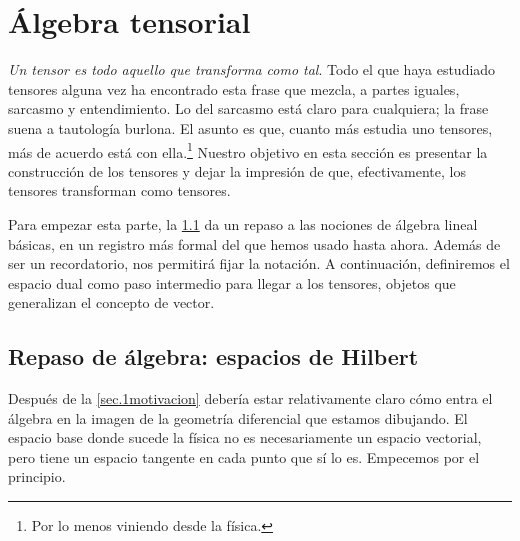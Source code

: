 \newpage
\section{Álgebra tensorial}
\label{sec.2tensores}

\emph{Un tensor es todo aquello que transforma como tal}. Todo el que haya estudiado tensores alguna vez ha encontrado esta frase que mezcla, a partes iguales, sarcasmo y entendimiento. Lo del sarcasmo está claro para cualquiera; la frase suena a tautología burlona. El asunto es que, cuanto más estudia uno tensores, más de acuerdo está con ella.\footnote{Por lo menos viniendo desde la física.} Nuestro objetivo en esta sección es presentar la construcción de los tensores y dejar la impresión de que, efectivamente, los tensores transforman como tensores. 

Para empezar esta parte, la \cref{subsec.2repaso} da un repaso a las nociones de álgebra lineal básicas, en un registro más formal del que hemos usado hasta ahora. Además de ser un recordatorio, nos permitirá fijar la notación. A continuación, definiremos el espacio dual como paso intermedio para llegar a los tensores, objetos que generalizan el concepto de vector.

\subsection{Repaso de álgebra: espacios de Hilbert}
\label{subsec.2repaso}

Después de la \cref{sec.1motivacion} debería estar relativamente claro cómo entra el álgebra en la imagen de la geometría diferencial que estamos dibujando. El espacio base donde sucede la física no es necesariamente un espacio vectorial, pero tiene un espacio tangente en cada punto que sí lo es. Empecemos por el principio.

